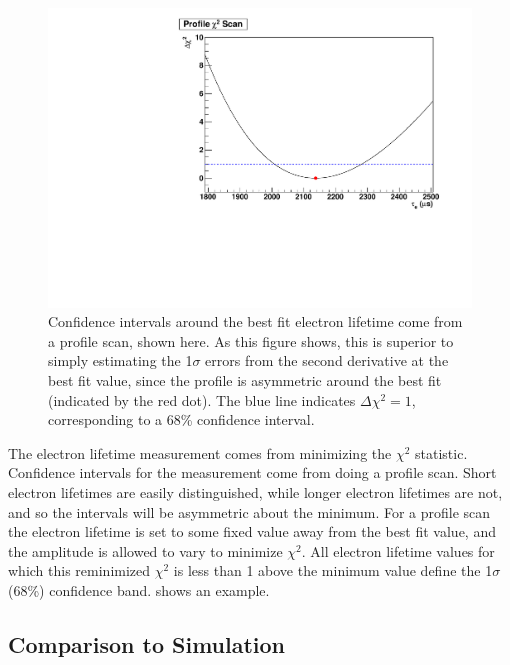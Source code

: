 \documentclass[herrin-thesis.tex]{subfiles}
\begin{document}
\begin{figure}[tbp]
\centering
\includegraphics[width=0.6\columnwidth]{./plots/el_run4252_profile.pdf}
\caption[A profile scan around the best-fit electron lifetime to determine confidence intervals]{Confidence intervals around the best fit electron lifetime come from a profile scan, shown here. As this figure shows, this is superior to simply estimating the 1\(\sigma\) errors from the second derivative at the best fit value, since the profile is asymmetric around the best fit (indicated by the red dot). The blue line indicates \(\Delta\chi^2 = 1\), corresponding to a 68\% confidence interval.}
\label{fig:el_profileel}
\end{figure}

The electron lifetime measurement comes from minimizing the \(\chi^2\) statistic. Confidence intervals for the measurement come from doing a profile scan. Short electron lifetimes are easily distinguished, while longer electron lifetimes are not, and so the intervals will be asymmetric about the minimum. For a profile scan the electron lifetime is set to some fixed value away from the best fit value, and the amplitude is allowed to vary to minimize \(\chi^2\). All electron lifetime values for which this reminimized \(\chi^2\) is less than 1 above the minimum value define the 1\(\sigma\) (68\%) confidence band.  shows an example.

\subsection{Comparison to Simulation}
\end{document}
